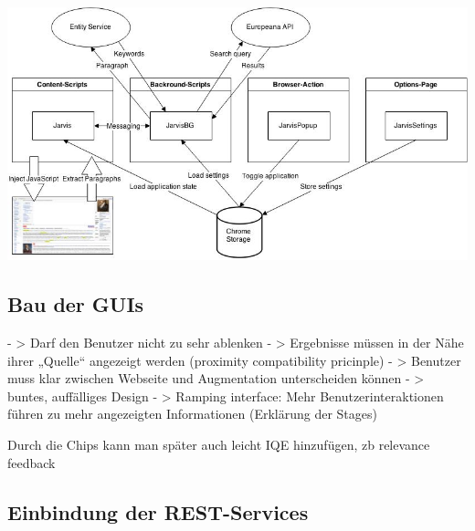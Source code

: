  \begin{minipage}{\linewidth}
	\centering
	\includegraphics[width=\linewidth]{Bilder/architektur.jpg}
	\label{fig:architektur}
 \end{minipage}


 \subsection{Bau der GUIs}
		- > Darf den Benutzer nicht zu sehr ablenken
		- > Ergebnisse müssen in der Nähe ihrer „Quelle“ angezeigt werden (proximity compatibility pricinple)
		- > Benutzer muss klar zwischen Webseite und Augmentation unterscheiden können
		- > buntes, auffälliges Design
		- > Ramping interface: Mehr Benutzerinteraktionen führen zu mehr angezeigten Informationen (Erklärung der Stages) 


 Durch die Chips kann man später auch leicht IQE hinzufügen, zb relevance feedback
 \subsection{Einbindung der REST-Services}